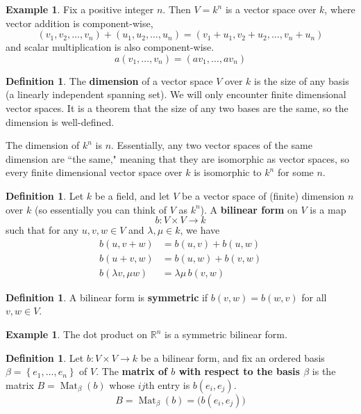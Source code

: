 \documentclass[12pt]{article}
\theoremstyle{definition}
\newtheorem{definition}[theorem]{Definition}
\newtheorem{example}[theorem]{Example}
\newcommand{\R}{\mathbb{R}}
\newcommand{\lam}{\lambda}
\newcommand{\lb}{\left\{}
\newcommand{\rb}{\right\}}
\newcommand{\tbf}{\textbf}
\DeclareMathOperator{\Mat}{Mat}
\begin{document}
\begin{example}
Fix a positive integer $n$. Then $V = k^n$ is a vector space over $k$, where vector addition is component-wise,
\[
	(v_1, v_2, \ldots, v_n) + (u_1, u_2, \ldots, u_n) = (v_1 + u_1, v_2 + u_2, \ldots, v_n + u_n)
\]
and scalar multiplication is also component-wise.
\[
	a(v_1, \ldots, v_n) = (av_1, \ldots, av_n)
\]
\end{example}

\begin{definition}
The \tbf{dimension} of a vector space $V$ over $k$ is the size of any basis (a linearly independent spanning set). We will only encounter finite dimensional vector spaces. It is a theorem that the size of any two bases are the same, so the dimension is well-defined. 

The dimension of $k^n$ is $n$. Essentially, any two vector spaces of the same dimension are ``the same," meaning that they are isomorphic as vector spaces, so every finite dimensional vector space over $k$ is isomorphic to $k^n$ for some $n$.
\end{definition}

\begin{definition}
Let $k$ be a field, and let $V$ be a vector space of (finite) dimension $n$ over $k$ (so essentially you can think of $V$ as $k^n$). A \tbf{bilinear form} on $V$ is a map
\[
	b:V \times V \to k
\]
such that for any $u, v, w \in V$ and $\lam, \mu \in k$, we have
\begin{align*}
	b(u, v+w) &= b(u,v) + b(u,w) \\
	b(u+v, w) &= b(u,w) + b(v,w) \\
	b(\lam v, \mu w) &= \lam \mu \, b(v,w)
\end{align*}
\end{definition}

\begin{definition}
A bilinear form is \tbf{symmetric} if $b(v,w) = b(w,v)$ for all $v,w \in V$.
\end{definition}

\begin{example}
The dot product on $\R^n$ is a symmetric bilinear form.
\end{example}

\begin{definition}
Let $b:V \times V \to k$ be a bilinear form, and fix an ordered basis $\beta = \lb e_1, \ldots, e_n \rb$ of $V$. The \tbf{matrix of $b$ with respect to the basis $\beta$} is the matrix $B = \Mat_\beta(b)$ whose $ij$th entry is $b(e_i, e_j)$.
\[
	B = \Mat_\beta(b) = \Big( b(e_i, e_j) \Big)
\]
\end{definition}
\end{document}

